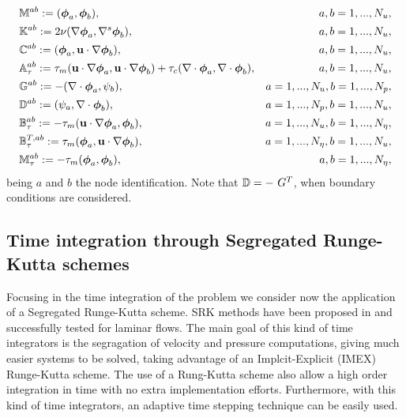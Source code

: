 \begin{align*}
&\mathbb{M}^{ab}:=(\boldsymbol{\phi}_{a},\boldsymbol{\phi}_{b}),&a,b=1,...,N_u,\\
&\mathbb{K}^{ab}:=2\nu(\nabla\boldsymbol{\phi}_{a},\nabla^s\boldsymbol{\phi}_{b}),&a,b=1,...,N_u,\\
&\mathbb{C}^{ab}:=(\boldsymbol{\phi}_{a},{\bf u}\cdot\nabla\boldsymbol{\phi}_{b}),&a,b=1,...,N_u,\\
&\mathbb{A}_{\tau}^{ab}:=\tau_m({\bf u}\cdot\nabla\boldsymbol{\phi}_{a},{\bf u}\cdot\nabla\boldsymbol{\phi}_{b})+\tau_c(\nabla\cdot\boldsymbol{\phi}_{a},\nabla\cdot\boldsymbol{\phi}_{b}),&a,b=1,...,N_u,\\
&\mathbb{G}^{ab}:=-(\nabla\cdot\boldsymbol{\phi}_{a},\psi_{b}),&a=1,...,N_u,b=1,...,N_p,\\
&\mathbb{D}^{ab}:=(\psi_{a},\nabla\cdot\boldsymbol{\phi}_{b}),&a=1,...,N_p,b=1,...,N_u,\\
&\mathbb{B}_{\tau}^{ab}:=-\tau_m({\bf u}\cdot\nabla\boldsymbol{\phi}_{a},\boldsymbol{\phi}_{b}),&a=1,...,N_u,b=1,...,N_\eta,\\
&\mathbb{B}_{\tau}^{T,ab}:=\tau_m(\boldsymbol{\phi}_{a},{\bf u}\cdot\nabla\boldsymbol{\phi}_{b}),&a=1,...,N_\eta,b=1,...,N_u,\\
&\mathbb{M}_{\tau}^{ab}:=-\tau_m(\boldsymbol{\phi}_{a},\boldsymbol{\phi}_{b}),&a,b=1,...,N_\eta,
\end{align*}
being $a$ and $b$ the node identification. Note that $\D=-\	G^T$, when boundary conditions are considered.

\subsection{Time integration through Segregated Runge-Kutta schemes}
\label{subsec:C7_SRK}
Focusing in the time integration of the problem  we consider now the application of a Segregated Runge-Kutta scheme. SRK methods have been proposed in \cite{colomes_2015} and successfully tested for laminar flows. The main goal of this kind of time integrators is the segragation of velocity and pressure computations, giving much easier systems to be solved, taking advantage of an Implcit-Explicit (IMEX) Runge-Kutta scheme. The use of a Rung-Kutta scheme also allow a high order integration in time with no extra implementation efforts. Furthermore, with this kind of time integrators, an adaptive time stepping technique can be easily used.

